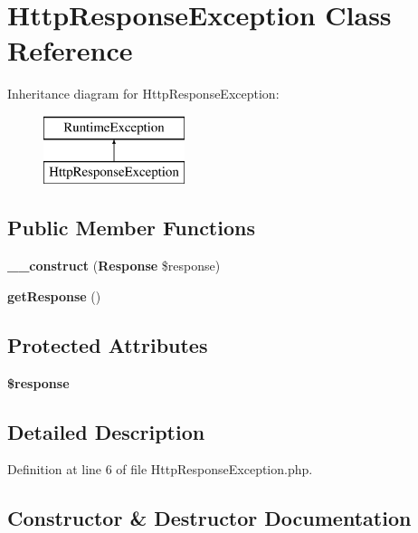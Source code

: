 \section{Http\+Response\+Exception Class Reference}
\label{class_illuminate_1_1_http_1_1_exception_1_1_http_response_exception}
Inheritance diagram for Http\+Response\+Exception\+:\begin{figure}[H]
\begin{center}
\leavevmode
\includegraphics[height=2.000000cm]{class_illuminate_1_1_http_1_1_exception_1_1_http_response_exception}
\end{center}
\end{figure}
\subsection*{Public Member Functions}
\begin{DoxyCompactItemize}
\item 
{\bf \+\_\+\+\_\+construct} ({\bf Response} \$response)
\item 
{\bf get\+Response} ()
\end{DoxyCompactItemize}
\subsection*{Protected Attributes}
\begin{DoxyCompactItemize}
\item 
{\bf \$response}
\end{DoxyCompactItemize}


\subsection{Detailed Description}


Definition at line 6 of file Http\+Response\+Exception.\+php.



\subsection{Constructor \& Destructor Documentation}

